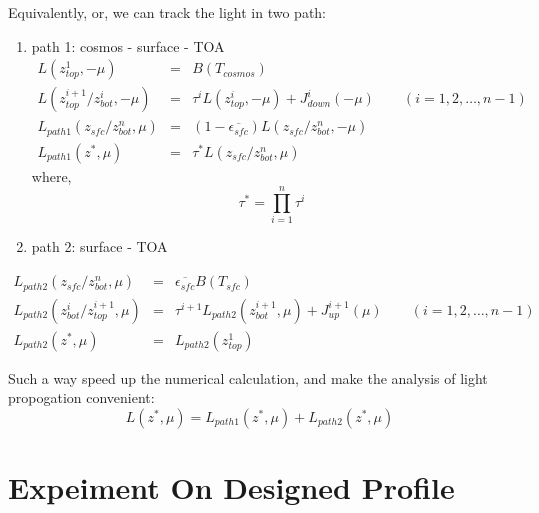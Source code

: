 \documentclass[a4paper]{report}
\begin{document}
Equivalently, or, we can track the light in two path:

\begin{enumerate} \label{eq:path1}
    \item path 1: cosmos - surface - TOA
    \begin{eqnarray}
        L(z_{top}^{1}, -\mu) & = & B(T_{cosmos}) \nonumber\\
        L(z_{top}^{i+1}/z_{bot}^{i}, -\mu) & = & \tau^{i}L(z_{top}^{i}, -\mu) + J_{down}^{i}(-\mu) 
        \qquad (i=1,2, \ldots, n-1) \nonumber\\
        L_{path1}(z_{sfc}/z_{bot}^{n}, \mu) & = & (1-\overline{\epsilon_{sfc}})L(z_{sfc}/z_{bot}^{n}, -\mu) \nonumber\\
        L_{path1}(z^{*}, \mu) & = & \tau^{*}L(z_{sfc}/z_{bot}^{n}, \mu)
    \end{eqnarray}
    where,
    \begin{equation} \label{eq:tau*}
        \tau^{*} = \prod_{i=1}^{n}\tau^{i}
    \end{equation}
    \item path 2: surface - TOA
\end{enumerate}
    \begin{eqnarray} \label{eq:path2}
        L_{path2}(z_{sfc}/z_{bot}^{n}, \mu) & = & \overline{\epsilon_{sfc}}B(T_{sfc}) \nonumber\\
        L_{path2}(z_{bot}^{i}/z_{top}^{i+1}, \mu) & = & \tau^{i+1}L_{path2}(z_{bot}^{i+1}, \mu) + J_{up}^{i+1}(\mu) 
        \qquad (i=1,2, \ldots, n-1) \nonumber\\
        L_{path2}(z^{*}, \mu) & = & L_{path2}(z_{top}^{1})
    \end{eqnarray}

Such a way speed up the numerical calculation, and make the analysis of light propogation convenient:
\begin{equation} \label{eq:path1 and path2}
    L(z^{*}, \mu) = L_{path1}(z^{*}, \mu) + L_{path2}(z^{*}, \mu)
\end{equation}

\chapter{Expeiment On Designed Profile}
\end{document}
